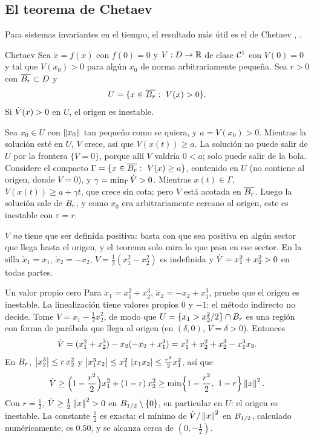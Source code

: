
\subsection{El teorema de Chetaev}

Para sistemas invariantes en el tiempo, el resultado más útil es el de Chetaev \citep{Che61}, \citep[Teo.~4.3]{Kha02}.

\begin{teorema}[label=thm:vt-cetaev]{Chetaev}
Sea $\dot x=f(x)$ con $f(0)=0$ y $V:D\to\mathbb{R}$ de clase $\mathcal{C}^{1}$ con $V(0)=0$ y tal que $V(x_0)>0$ para algún $x_0$ de norma arbitrariamente pequeña. Sea $r>0$ con $\overline{B_{r}}\subset D$ y
\[
  U=\{x\in\overline{B_{r}}:\ V(x)>0\} .
\]
Si $\dot V(x)>0$ en $U$, el origen es inestable.
\end{teorema}

\begin{demostracion}
Sea $x_0\in U$ con $\left\lVert x_0\right\rVert$ tan pequeño como se quiera, y $a=V(x_0)>0$. Mientras la solución esté en $U$, $V$ crece, así que $V(x(t))\ge a$. La solución no puede salir de $U$ por la frontera $\{V=0\}$, porque allí $V$ valdría $0<a$; solo puede salir de la bola. Considere el compacto $\Gamma=\{x\in\overline{B_{r}}:\ V(x)\ge a\}$, contenido en $U$ (no contiene al origen, donde $V=0$), y $\gamma=\min_\Gamma\dot V>0$. Mientras $x(t)\in\Gamma$, $V(x(t))\ge a+\gamma t$, que crece sin cota; pero $V$ está acotada en $\overline{B_{r}}$. Luego la solución sale de $B_{r}$, y como $x_0$ era arbitrariamente cercano al origen, este es inestable con $\varepsilon=r$.
\end{demostracion}

$V$ \emph{no} tiene que ser definida positiva: basta con que sea positiva en algún sector que llega hasta el origen, y el teorema solo mira lo que pasa en ese sector. En la silla $\dot x_1=x_1$, $\dot x_2=-x_2$, $V=\tfrac12(x_1^2-x_2^2)$ es indefinida y $\dot V=x_1^2+x_2^2>0$ en todas partes.

\begin{ejemplo}[label=ej:vt-cetaev]{Un valor propio cero}
Para $\dot x_1=x_1^2+x_2^3$, $\dot x_2=-x_2+x_1^3$, pruebe que el origen es inestable.
\solucion La linealización tiene valores propios $0$ y $-1$: el método indirecto no decide. Tome $V=x_1-\tfrac12x_2^2$, de modo que $U=\{x_1>x_2^2/2\}\cap B_{r}$ es una región con forma de parábola que llega al origen (en $(\delta,0)$, $V=\delta>0$). Entonces
\[
  \dot V=(x_1^2+x_2^3)-x_2(-x_2+x_1^3)=x_1^2+x_2^2+x_2^3-x_1^3x_2 .
\]
En $B_{r}$, $\left\lvert x_2^3\right\rvert\le r\,x_2^2$ y $\left\lvert x_1^3x_2\right\rvert\le x_1^2\,\left\lvert x_1x_2\right\rvert\le\tfrac{r^2}2x_1^2$, así que
\[
  \Vdot\ge\Bigl(1-\frac{r^2}2\Bigr)x_1^2+(1-r)\,x_2^2\ge\min\Bigl\{1-\frac{r^2}2,\ 1-r\Bigr\}\norm x^2 .
\]
Con $r=\tfrac12$, $\dot V\ge\tfrac12\left\lVert x\right\rVert^2>0$ en $B_{1/2}\setminus\{0\}$, en particular en $U$: el origen es inestable. La constante $\tfrac12$ es exacta: el mínimo de $\dot V/\left\lVert x\right\rVert^2$ en $B_{1/2}$, calculado numéricamente, es $0.50$, y se alcanza cerca de $(0,-\tfrac12)$.
\end{ejemplo}

